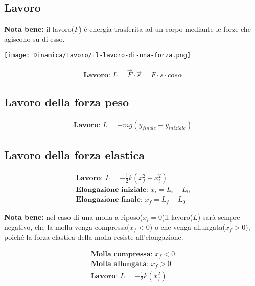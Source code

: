 \subsection{Lavoro}

\textbf{Nota bene: } il lavoro($F$) è energia trasferita ad un corpo mediante le forze che agiscono su di esso. \\
\begin{center}
    \texttt{[image: Dinamica/Lavoro/il-lavoro-di-una-forza.png]}
\end{center}
\begin{gather*}
    \textbf{Lavoro: } L = \vec{F} \cdot \vec{s} = F \cdot  s \cdot cos \alpha
\end{gather*}

\subsection{Lavoro della forza peso}

\begin{gather*}
    \textbf{Lavoro: } L = -mg(y_{finale} - y_{iniziale})
\end{gather*}

\subsection{Lavoro della forza elastica}

\begin{gather*}
    \textbf{Lavoro: } L = - \frac{1}{2} k (x_f^2 - x_i^2) \\
    \textbf{Elongazione iniziale: } x_i = L_i - L_0 \\
    \textbf{Elongazione finale: } x_f = L_f - L_0
\end{gather*}

\textbf{Nota bene: } nel caso di una molla a riposo($x_i = 0$)il lavoro($L$) sarà sempre negativo, che la molla venga compressa($x_f < 0$) o che venga allungata($x_f > 0$), poiché la forza elastica della molla resiste all'elongazione.

\begin{gather*}
    \textbf{Molla compressa: } x_f < 0 \\
    \textbf{Molla allungata: } x_f > 0 \\
    \textbf{Lavoro: } L = - \frac{1}{2} k (x_f^2)
\end{gather*}
